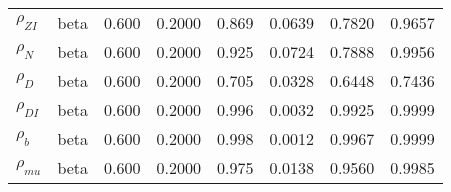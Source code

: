 \begin{center}
\begin{longtable}{llcccccc}
${\rho_{ZI}}$ & beta &   0.600 & 0.2000 &   0.869& 0.0639 &  0.7820 &  0.9657 \\ 
${\rho_N}$ & beta &   0.600 & 0.2000 &   0.925& 0.0724 &  0.7888 &  0.9956 \\ 
${\rho_D}$ & beta &   0.600 & 0.2000 &   0.705& 0.0328 &  0.6448 &  0.7436 \\ 
${\rho_{DI}}$ & beta &   0.600 & 0.2000 &   0.996& 0.0032 &  0.9925 &  0.9999 \\ 
${\rho_b}$ & beta &   0.600 & 0.2000 &   0.998& 0.0012 &  0.9967 &  0.9999 \\ 
${\rho_{mu}}$ & beta &   0.600 & 0.2000 &   0.975& 0.0138 &  0.9560 &  0.9985 \\ 
\end{longtable}
 \end{center}
